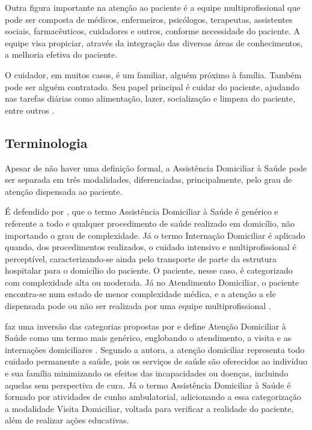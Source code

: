 Outra figura importante na atenção ao paciente é a equipe multiprofissional
que pode ser composta de médicos, enfermeiros, psicólogos, terapeutas,
assistentes sociais, farmacêuticos, cuidadores e outros, conforme necessidade
do paciente. A equipe visa propiciar, através da integração das diversas áreas 
de conhecimentos, a melhoria efetiva do paciente.

O cuidador, em muitos casos, é um familiar, alguém próximo à família. Também
pode ser alguém contratado. Seu papel principal é cuidar do paciente, ajudando
nas tarefas diárias como alimentação, lazer, socialização e limpeza do
paciente, entre outros \cite{amaral2001assistencia}.


\subsection{Terminologia}\label{subsec:terminologia}

Apesar de não haver uma definição formal, a Assistência Domiciliar à Saúde pode
ser separada em três modalidades, diferenciadas, principalmente, pelo grau de 
atenção dispensada ao paciente. 


É defendido por , que o termo Assistência Domiciliar
à Saúde é genérico e referente a todo e qualquer procedimento de saúde realizado
em domicílio, não importando o grau de complexidade. Já o termo Internação
Domiciliar é aplicado quando, dos procedimentos realizados, o cuidado intensivo
e multiprofissional é perceptível, caracterizando-se ainda pelo transporte de
parte da estrutura hospitalar para o domicílio do paciente. O paciente, nesse
caso, é categorizado com complexidade alta ou moderada.
Já no Atendimento Domiciliar, o paciente encontra-se num estado de menor 
complexidade médica, e a atenção a ele dispensada pode ou não ser realizada por
uma equipe multiprofissional \cite{tavolari2000desenvolvimento}.

 faz uma inversão das categorias propostas
por  e  define Atenção Domiciliar à
Saúde como um termo mais genérico, englobando o atendimento, a visita e as
internações domiciliares \cite{giacomozzi2006pratica}. Segundo a autora, a
atenção domiciliar representa todo cuidado permanente a
saúde, pois os serviços de saúde são oferecidos ao indivíduo e sua família
minimizando os efeitos das incapacidades ou doenças, incluindo aquelas
sem perspectiva de cura. Já o termo Assistência Domiciliar à Saúde é formado
por atividades de cunho ambulatorial, adicionando a essa categorização a
modalidade Visita Domiciliar, voltada para verificar a realidade do paciente,
além de realizar ações educativas.

